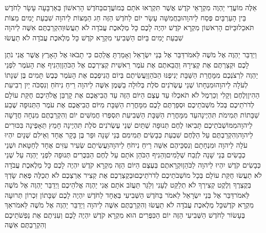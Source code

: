 \documentclass[../main/main.tex]{subfiles}
\begin{document}
\begin{multicols*}{\ncols}
אֵלֶּה מוֹעֲדֵי יַהְוֶה מִקְרָאֵי קֹדֶשׁ אֲשֶׁר תִּקְרְאוּ אֹתָם בְּמוֹעֲדָם\PreVerseSpace{}בַּחֹדֶשׁ הָרִאשׁוֹן בְּאַרְבָּעָה עָשָׂר לַחֹדֶשׁ בֵּין הָעַרְבָּיִם פֶּסַח לַיהוָה\PreVerseSpace{}וּבַחֲמִשָּׁה עָשָׂר יוֹם לַחֹדֶשׁ הַזֶּה חַג הַמַּצּוֹת לַיהוָה שִׁבְעַת יָמִים מַצּוֹת תֹּאכֵלוּ\PreVerseSpace{}בַּיּוֹם הָרִאשׁוֹן מִקְרָא קֹדֶשׁ יִהְיֶה לָכֶם כָּל מְלֶאכֶת עֲבֹדָה לֹא תַעֲשׂוּ\PreVerseSpace{}וְהִקְרַבְתֶּם אִשֶּׁה לַיהוָה שִׁבְעַת יָמִים בַּיּוֹם הַשְּׁבִיעִי מִקְרָא קֹדֶשׁ כָּל מְלֶאכֶת עֲבֹדָה לֹא תַעֲשׂוּ\OpenSection{}\par
{}וַיְדַבֵּר יַהְוֶה אֶל מֹשֶׁה לֵּאמֹר\PreVerseSpace{}דַּבֵּר אֶל בְּנֵי יִשְׂרָאֵל וְאָמַרְתָּ אֲלֵהֶם כִּי תָבֹאוּ אֶל הָאָרֶץ אֲשֶׁר אֲנִי נֹתֵן לָכֶם וּקְצַרְתֶּם אֶת קְצִירָהּ וַהֲבֵאתֶם אֶת עֹמֶר רֵאשִׁית קְצִירְכֶם אֶל הַכֹּהֵן\PreVerseSpace{}וְהֵנִיף אֶת הָעֹמֶר לִפְנֵי יַהְוֶה לִרְצֹנְכֶם מִמָּחֳרַת הַשַּׁבָּת יְנִיפֶנּוּ הַכֹּהֵן\PreVerseSpace{}וַעֲשִׂיתֶם בְּיוֹם הֲנִיפְכֶם אֶת הָעֹמֶר כֶּבֶשׂ תָּמִים בֶּן שְׁנָתוֹ לְעֹלָה לַיהוָה\PreVerseSpace{}וּמִנְחָתוֹ שְׁנֵי עֶשְׂרֹנִים סֹלֶת בְּלוּלָה בַשֶּׁמֶן אִשֶּׁה לַיהוָה רֵיחַ נִיחֹחַ וְנִסְכֹּה יַיִן רְבִיעִת הַהִין\PreVerseSpace{}וְלֶחֶם וְקָלִי וְכַרְמֶל לֹא תֹאכְלוּ עַד עֶצֶם הַיּוֹם הַזֶּה עַד הֲבִיאֲכֶם אֶת קָרְבַּן אֱלֹהֵיכֶם חֻקַּת עוֹלָם לְדֹרֹתֵיכֶם בְּכֹל מֹשְׁבֹתֵיכֶם \ClosedSection{}וּסְפַרְתֶּם לָכֶם מִמָּחֳרַת הַשַּׁבָּת מִיּוֹם הֲבִיאֲכֶם אֶת עֹמֶר הַתְּנוּפָה שֶׁבַע שַׁבָּתוֹת תְּמִימֹת תִּהְיֶינָה\PreVerseSpace{}עַד מִמָּחֳרַת הַשַּׁבָּת הַשְּׁבִיעִת תִּסְפְּרוּ חֲמִשִּׁים יוֹם וְהִקְרַבְתֶּם מִנְחָה חֲדָשָׁה לַיהוָה\PreVerseSpace{}מִמּוֹשְׁבֹתֵיכֶם תָּבִיאּוּ לֶחֶם תְּנוּפָה שְׁתַּיִם שְׁנֵי עֶשְׂרֹנִים סֹלֶת תִּהְיֶינָה חָמֵץ תֵּאָפֶינָה בִּכּוּרִים לַיהוָה\PreVerseSpace{}וְהִקְרַבְתֶּם עַל הַלֶּחֶם שִׁבְעַת כְּבָשִׂים תְּמִימִם בְּנֵי שָׁנָה וּפַר בֶּן בָּקָר אֶחָד וְאֵילִם שְׁנָיִם יִהְיוּ עֹלָה לַיהוָה וּמִנְחָתָם וְנִסְכֵּיהֶם אִשֵּׁה רֵיחַ נִיחֹחַ לַיהוָה\PreVerseSpace{}וַעֲשִׂיתֶם שְׂעִיר עִזִּים אֶחָד לְחַטָּאת וּשְׁנֵי כְבָשִׂים בְּנֵי שָׁנָה לְזֶבַח שְׁלָמִים\PreVerseSpace{}וְהֵנִיף הַכֹּהֵן אֹתָם עַל לֶחֶם הַבִּכֻּרִים תְּנוּפָה לִפְנֵי יַהְוֶה עַל שְׁנֵי כְּבָשִׂים קֹדֶשׁ יִהְיוּ לַיהוָה לַכֹּהֵן\PreVerseSpace{}וּקְרָאתֶם בְּעֶצֶם הַיּוֹם הַזֶּה מִקְרָא קֹדֶשׁ יִהְיֶה לָכֶם כָּל מְלֶאכֶת עֲבֹדָה לֹא תַעֲשׂוּ חֻקַּת עוֹלָם בְּכָל מוֹשְׁבֹתֵיכֶם לְדֹרֹתֵיכֶם\PreVerseSpace{}וּבְקֻצְרְכֶם אֶת קְצִיר אַרְצְכֶם לֹא תְכַלֶּה פְּאַת שָׂדְךָ בְּקֻצְרֶךָ וְלֶקֶט קְצִירְךָ לֹא תְלַקֵּט לֶעָנִי וְלַגֵּר תַּעֲזֹב אֹתָם אֲנִי יַהְוֶה אֱלֹהֵיכֶם \ClosedSection{}וַיְדַבֵּר יַהְוֶה אֶל מֹשֶׁה לֵּאמֹר\PreVerseSpace{}דַּבֵּר אֶל בְּנֵי יִשְׂרָאֵל לֵאמֹר בַּחֹדֶשׁ הַשְּׁבִיעִי בְּאֶחָד לַחֹדֶשׁ יִהְיֶה לָכֶם שַׁבָּתוֹן זִכְרוֹן תְּרוּעָה מִקְרָא קֹדֶשׁ\PreVerseSpace{}כָּל מְלֶאכֶת עֲבֹדָה לֹא תַעֲשׂוּ וְהִקְרַבְתֶּם אִשֶּׁה לַיהוָה \ClosedSection{}וַיְדַבֵּר יַהְוֶה אֶל מֹשֶׁה לֵּאמֹר\PreVerseSpace{}אַךְ בֶּעָשׂוֹר לַחֹדֶשׁ הַשְּׁבִיעִי הַזֶּה יוֹם הַכִּפֻּרִים הוּא מִקְרָא קֹדֶשׁ יִהְיֶה לָכֶם וְעִנִּיתֶם אֶת נַפְשֹׁתֵיכֶם וְהִקְרַבְתֶּם אִשֶּׁה 
\end{multicols*}
\end{document}
